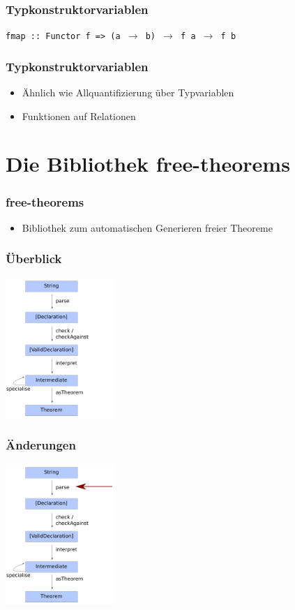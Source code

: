 \documentclass{beamer}
\begin{document}
\begin{frame}
\frametitle{Typkonstruktorvariablen}
\texttt{fmap :: Functor f => (a $\rightarrow$ b) $\rightarrow$ f\ a $\rightarrow$ f\ b}
\end{frame}

\begin{frame}
\frametitle{Typkonstruktorvariablen}
\begin{itemize}
\item Ähnlich wie Allquantifizierung über Typvariablen
\item Funktionen auf Relationen
\end{itemize}
\end{frame}

\section{Die Bibliothek free-theorems}

\begin{frame}
\frametitle{free-theorems}
\begin{itemize}
\item Bibliothek zum automatischen Generieren freier Theoreme
\end{itemize}
\end{frame}

\begin{frame}
\frametitle{Überblick}
\includegraphics[height=200px]{overview-free-theorems}
\end{frame}

\begin{frame}
\frametitle{Änderungen}
\includegraphics[height=200px]{overview-free-theorems-pfeil1}
\end{frame}
\end{document}

